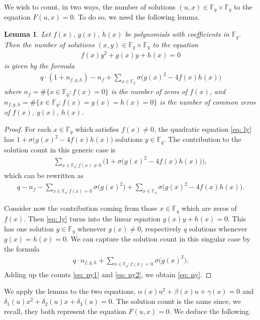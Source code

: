 \documentclass[11pt]{amsart}
\newcommand{\F}{\mathbb{F}}
\newcommand{\Fq}{\F_{\!q}}
\newtheorem{lem}[thm]{Lemma}
\theoremstyle{definition}
\begin{document}
We wish to count, in two ways, the number of solutions $(u,x)\in \Fq\times \Fq$ to the equation $F(u,x)=0$. To do so, we need the following lemma.

\begin{lem} Let $f(x)$, $g(x)$, $h(x)$ be polynomials with coefficients in $\Fq$. Then the number of solutions $(x,y)\in \Fq\times \Fq$ to the equation
\begin{align}\label{eq: ly}
f(x)y^2+g(x)y+h(x)=0
\end{align}
is given by the formula
\begin{align}\label{eq: ny}
q\cdot (1+n_{f,g,h})-n_f+\sum_{x\in \Fq} \sigma\big(g(x)^2-4f(x)h(x)\big)
\end{align}
where $n_f=\#\{x\in \Fq: f(x)=0\}$ is the number of zeros of $f(x)$, and $n_{f,g,h}=\#\{x\in \Fq: f(x)=g(x)=h(x)=0\}$ is the number of common zeros of $f(x)$, $g(x)$, $h(x)$.
\end{lem}

\begin{proof}
For each $x\in \Fq$ which satisfies $f(x)\neq 0$, the quadratic equation \eqref{eq: ly} has $1+\sigma\big(g(x)^2-4f(x)h(x)\big)$ solutions $y\in \Fq$. The contribution to the solution count in this generic case is
\begin{align*}
\sum_{x\in \Fq: f(x)\neq 0}\Big(1+ \sigma\big(g(x)^2-4f(x)h(x)\big)\Big),
\end{align*}
which can be rewritten as 
\begin{align}\label{eq: ny1}
q-n_f- \sum_{x\in \Fq: f(x)=0}\sigma\big(g(x)^2\big)+\sum_{x\in \Fq} \sigma\big(g(x)^2-4f(x)h(x)\big).
\end{align}

Consider now the contribution coming from those $x\in \Fq$ which are zeros of $f(x)$. Then \eqref{eq: ly}  turns into the linear equation $g(x)y+h(x)=0$. This has one solution $y\in \Fq$ whenever $g(x)\neq 0$, respectively $q$ solutions whenever $g(x)=h(x)=0$. We can capture the solution count in this singular case by the formula
\begin{align}\label{eq: ny2}
q\cdot n_{f,g,h}+\sum_{x\in \Fq: f(x)=0}\sigma\big(g(x)^2\big).
\end{align}
Adding up the counts \eqref{eq: ny1} and \eqref{eq: ny2}, we obtain \eqref{eq: ny}.
\end{proof}

We apply the lemma to the two equations, $\alpha(x)u^2+\beta(x)u+\gamma(x)=0$ and $\delta_1(u)x^2+\delta_2(u)x+\delta_3(u)=0$. The solution count is the same since, we recall, they both represent the equation $F(u,x)=0$. We deduce the following.
\end{document}
